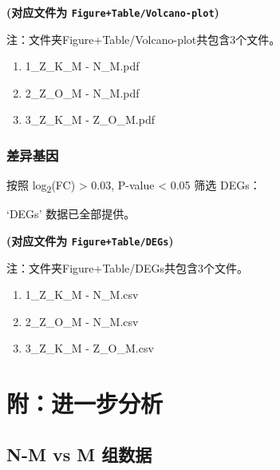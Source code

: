 \documentclass[
]{article}
\providecommand{\tightlist}{%
  \setlength{\itemsep}{0pt}\setlength{\parskip}{0pt}}
\begin{document}
\textbf{(对应文件为 \texttt{Figure+Table/Volcano-plot})}

\begin{center}\begin{tcolorbox}[colback=gray!10, colframe=gray!50, width=0.9\linewidth, arc=1mm, boxrule=0.5pt]注：文件夹Figure+Table/Volcano-plot共包含3个文件。

\begin{enumerate}\tightlist
\item 1\_Z\_K\_M - N\_M.pdf
\item 2\_Z\_O\_M - N\_M.pdf
\item 3\_Z\_K\_M - Z\_O\_M.pdf
\end{enumerate}\end{tcolorbox}
\end{center}

\hypertarget{ux5deeux5f02ux57faux56e0}{%
\subsubsection{差异基因}\label{ux5deeux5f02ux57faux56e0}}

按照 \textbar log\textsubscript{2}(FC)\textbar{} \textgreater{} 0.03, P-value \textless{} 0.05 筛选 DEGs：

`DEGs' 数据已全部提供。

\textbf{(对应文件为 \texttt{Figure+Table/DEGs})}

\begin{center}\begin{tcolorbox}[colback=gray!10, colframe=gray!50, width=0.9\linewidth, arc=1mm, boxrule=0.5pt]注：文件夹Figure+Table/DEGs共包含3个文件。

\begin{enumerate}\tightlist
\item 1\_Z\_K\_M - N\_M.csv
\item 2\_Z\_O\_M - N\_M.csv
\item 3\_Z\_K\_M - Z\_O\_M.csv
\end{enumerate}\end{tcolorbox}
\end{center}

\hypertarget{workflow2}{%
\section{附：进一步分析}\label{workflow2}}

\hypertarget{n-m-vs-m-ux7ec4ux6570ux636e}{%
\subsection{N-M vs M 组数据}\label{n-m-vs-m-ux7ec4ux6570ux636e}}
\end{document}
